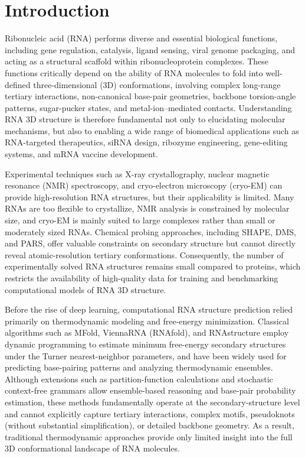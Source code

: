 \chapter{Introduction}

Ribonucleic acid (RNA) performs diverse and essential biological functions, including gene regulation, catalysis, ligand sensing, viral genome packaging, and acting as a structural scaffold within ribonucleoprotein complexes. These functions critically depend on the ability of RNA molecules to fold into well-defined three-dimensional (3D) conformations, involving complex long-range tertiary interactions, non-canonical base-pair geometries, backbone torsion-angle patterns, sugar-pucker states, and metal-ion–mediated contacts. Understanding RNA 3D structure is therefore fundamental not only to elucidating molecular mechanisms, but also to enabling a wide range of biomedical applications such as RNA-targeted therapeutics, siRNA design, ribozyme engineering, gene-editing systems, and mRNA vaccine development.

Experimental techniques such as X-ray crystallography, nuclear magnetic resonance (NMR) spectroscopy, and cryo-electron microscopy (cryo-EM) can provide high-resolution RNA structures, but their applicability is limited. Many RNAs are too flexible to crystallize, NMR analysis is constrained by molecular size, and cryo-EM is mainly suited to large complexes rather than small or moderately sized RNAs. Chemical probing approaches, including SHAPE, DMS, and PARS, offer valuable constraints on secondary structure but cannot directly reveal atomic-resolution tertiary conformations. Consequently, the number of experimentally solved RNA structures remains small compared to proteins, which restricts the availability of high-quality data for training and benchmarking computational models of RNA 3D structure.

Before the rise of deep learning, computational RNA structure prediction relied primarily on thermodynamic modeling and free-energy minimization. Classical algorithms such as MFold, ViennaRNA (RNAfold), and RNAstructure employ dynamic programming to estimate minimum free-energy secondary structures under the Turner nearest-neighbor parameters, and have been widely used for predicting base-pairing patterns and analyzing thermodynamic ensembles\cite{Zuker2003Mfold, Lorenz2011ViennaRNA, Reuter2010RNAstructure}. Although extensions such as partition-function calculations and stochastic context-free grammars allow ensemble-based reasoning and base-pair probability estimation, these methods fundamentally operate at the secondary-structure level and cannot explicitly capture tertiary interactions, complex motifs, pseudoknots (without substantial simplification), or detailed backbone geometry. As a result, traditional thermodynamic approaches provide only limited insight into the full 3D conformational landscape of RNA molecules.


